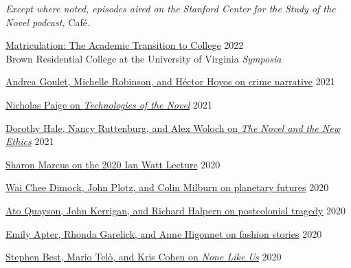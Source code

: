 \documentclass[
  12pt,
  letterpaper,
]{article}
\begin{document}
\emph{Except where noted, episodes aired on the Stanford Center
for the Study of the Novel podcast, }Café\emph{.}

\href{https://virginiaaudio.org/\#/symposia/}{Matriculation: The
Academic Transition to College} \hfill 2022\\
Brown Residential College at the University of
Virginia \emph{Symposia}

\href{https://web.archive.org/web/20220429010015/https://novel.stanford.edu/csn-cafe/2021/7/23/crime-narratives-with-andrea-goulet-michelle-robinson-and-hctor-hoyos-43021-je87a}{Andrea
Goulet, Michelle Robinson, and Héctor Hoyos on crime narrative}
\hfill 2021

\href{https://web.archive.org/web/20220429093420/https://novel.stanford.edu/csn-cafe/2021/7/23/nicholas-paige-technologies-of-the-novel-2821}{Nicholas
Paige on \emph{Technologies of the Novel}} \hfill 2021

\href{https://web.archive.org/web/20220429093353/https://novel.stanford.edu/csn-cafe/2021/7/23/books-at-the-center-dorothy-hale-the-novel-and-the-new-ethics-11521}{Dorothy
Hale, Nancy Ruttenburg, and Alex Woloch on \emph{The Novel and the New
Ethics}} \hfill 2021

\href{https://web.archive.org/web/20220429093326/https://novel.stanford.edu/csn-cafe/2021/7/23/sharon-marcus-on-her-ian-watt-lecture-103020}{Sharon
Marcus on the 2020 Ian Watt Lecture} \hfill 2020

\href{https://web.archive.org/web/20220429010109/https://novel.stanford.edu/csn-cafe/2021/7/23/wai-chee-dimock-john-plotz-and-colin-milburn-on-the-literature-of-planetary-futures-52319}{Wai
Chee Dimock, John Plotz, and Colin Milburn on planetary futures}
\hfill 2020

\href{https://web.archive.org/web/20220429010041/https://novel.stanford.edu/csn-cafe/2021/7/23/ato-quayson-john-kerrigan-and-richard-halpern-on-postcolonial-tragedy-91519}{Ato
Quayson, John Kerrigan, and Richard Halpern on postcolonial tragedy}
\hfill 2020

\href{https://web.archive.org/web/20220429093237/https://novel.stanford.edu/csn-cafe/2021/7/23/fashion-stories-emily-apter-rhonda-garelick-and-anne-higonnet-on-the-cultural-history-of-clothing-1920}{Emily
Apter, Rhonda Garelick, and Anne Higonnet on fashion stories}
\hfill 2020

\href{https://web.archive.org/web/20220429093211/https://novel.stanford.edu/csn-cafe/2021/7/23/books-at-the-center-stephen-best-mario-tel-and-kris-cohen-on-none-like-us-101019}{Stephen
Best, Mario Telò, and Kris Cohen on \emph{None Like Us}} \hfill 2020
\end{document}
